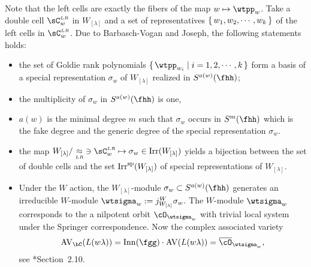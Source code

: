 \documentclass[counting_main.tex]{subfiles}
\begin{document}
Note that the left cells are exactly the fibers of the map $w\mapsto \wtpp_{w}$.
Take a double cell $\CLR_{w}$ in $W_{[\lambda]}$ and a set of representatives
$\set{w_{1}, w_{2}, \cdots, w_{k}}$ of the left cells in $\CLR_{w}$.
%
Due to Barbasch-Vogan\cite{BV1,BV2} and Joseph\cite{J1,J2,J3,J.av}, the
following statements holds:
\begin{itemize}
  \item the set of Goldie rank polynomials
        $\set{\wtpp_{w_{i}}|i = 1,2,\cdots,k}$ form a basis of a special
        representation $\sigma_{w}$ of $W_{[\lambda]}$ realized in
        $S^{a(w)}(\fhh)$;
  \item the multiplicity of $\sigma_{w}$ in $S^{a(w)}(\fhh)$ is one,
  \item $a(w)$ is the minimal degree $m$ such that $\sigma_{w}$ occurs in
        $S^{m}(\fhh)$ which is the fake degree and the generic degree of the
        special representation $\sigma_{w}$. 
  \item the map
        $W_{[\lambda]}/\approxLR \; \ni \CLR_{w}\mapsto \sigma_{w}\in \Irr(W_{[\lambda]})$
        yields a bijection between the set of double cells and the set
        $\mathrm{Irr}^{\text{sp}}(W_{[\lambda]})$ of special representations of $W_{[\lambda]}$.
  \item Under the $W$ action, the $W_{[\lambda]}$-module
        $\sigma_{w}\subset S^{a(w)}(\fhh)$ generates an irreducible $W$-module
        $\wtsigma_{w}:=j_{W_{[\lambda]}}^{W}\sigma_{w}$. The $W$-module
        $\wtsigma_{w}$ corresponds to the a nilpotent orbit $\cO_{\wtsigma_{w}}$
        with trivial local system under the Springer correspondence. Now the
        complex associated variety
        \[
        \AVC(L(w\lambda)) = \Gad\cdot \AV(L(w\lambda)) =\bcO_{\wtsigma_{w}},
        \]
        see \cite{J.av}*{Section~2.10}.
\end{itemize}
\end{document}
